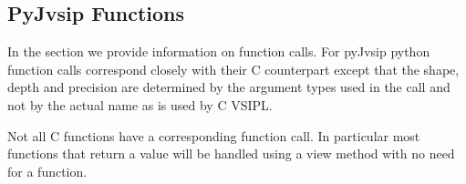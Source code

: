\subsection*{PyJvsip Functions}
In the \pyjv {} section we provide information on function calls. For pyJvsip python function calls correspond closely with their C counterpart except that the shape, depth and precision are determined by the argument types used in the call and not by the actual name as is used by C VSIPL.

Not all C functions have a corresponding \pyjv function call. In particular most functions that return a value will be handled using a view method with no need for a function.
 



















